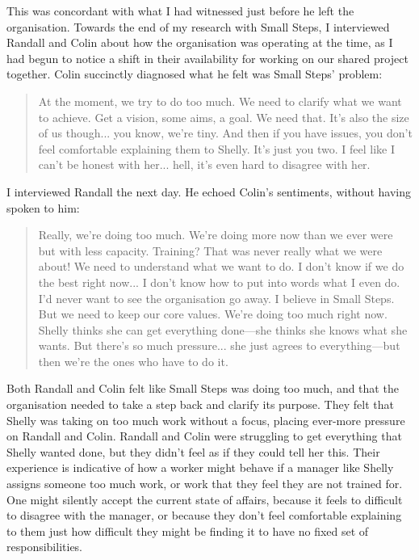 This was concordant with what I had witnessed just before he left the organisation. Towards the end of my research with Small Steps, I interviewed Randall and Colin about how the organisation was operating at the time, as I had begun to notice a shift in their availability for working on our shared project together. Colin succinctly diagnosed what he felt was Small Steps’ problem:
\begin{quote}
At the moment, we try to do too much. We need to clarify what we want to achieve. Get a vision, some aims, a goal. We need that. It's also the size of us though... you know, we're tiny. And then if you have issues, you don't feel comfortable explaining them to Shelly. It's just you two. I feel like I can't be honest with her... hell, it's even hard to disagree with her.
\end{quote}
I interviewed Randall the next day. He echoed Colin’s sentiments, without having spoken to him:
\begin{quote}
Really, we're doing too much. We're doing more now than we ever were but with less capacity. Training? That was never really what we were about! We need to understand what we want to do. I don't know if we do the best right now... I don't know how to put into words what I even do. I'd never want to see the organisation go away. I believe in Small Steps. But we need to keep our core values. We're doing too much right now. Shelly thinks she can get everything done—she thinks she knows what she wants. But there's so much pressure... she just agrees to everything—but then we're the ones who have to do it.
\end{quote}
Both Randall and Colin felt like Small Steps was doing too much, and that the organisation needed to take a step back and clarify its purpose. They felt that Shelly was taking on too much work without a focus, placing ever-more pressure on Randall and Colin. Randall and Colin were struggling to get everything that Shelly wanted done, but they didn't feel as if they could tell her this. Their experience is indicative of how a worker might behave if a manager like Shelly assigns someone too much work, or work that they feel they are not trained for. One might silently accept the current state of affairs, because it feels to difficult to disagree with the manager, or because they don't feel comfortable explaining to them just how difficult they might be finding it to have no fixed set of responsibilities.  

